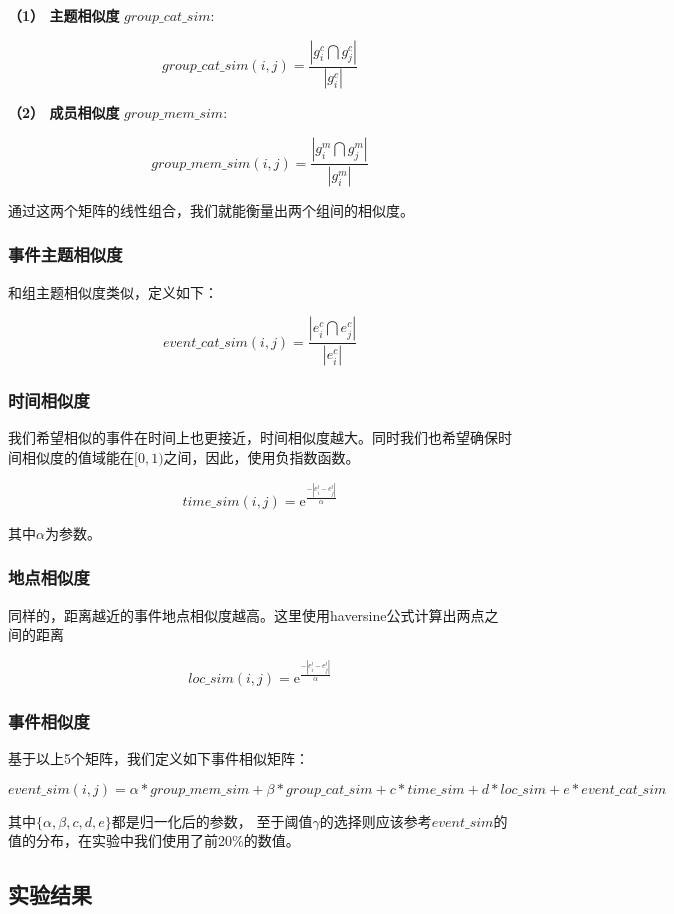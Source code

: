 \documentclass[12pt]{template}
\begin{document}
\textbf{（1） 主题相似度} \(group\_cat\_sim:\)

\[
group\_cat\_sim(i,j)=\frac{|g_i^c\bigcap g_j^c|}{|g_i^c|}
\]

\textbf{（2） 成员相似度} \(group\_mem\_sim:\)

\[
group\_mem\_sim(i,j)=\frac{|g_i^m\bigcap g_j^m|}{|g_i^m|}
\]

通过这两个矩阵的线性组合，我们就能衡量出两个组间的相似度。

\subsubsection{事件主题相似度}

和组主题相似度类似，定义如下：

\[
event\_cat\_sim(i,j)=\frac{|e_i^c\bigcap e_j^c|}{|e_i^c|}
\]

\subsubsection{时间相似度}

我们希望相似的事件在时间上也更接近，时间相似度越大。同时我们也希望确保时间相似度的值域能在\([0,1)\)之间，因此，使用负指数函数。

\[    
time\_sim(i,j)=\mathrm{e}^\frac{-|e_i^t-e_j^t|}{\alpha}
\]

其中\(\alpha\)为参数。

\subsubsection{地点相似度}

同样的，距离越近的事件地点相似度越高。这里使用haversine公式计算出两点之间的距离

\[    
loc\_sim(i,j)=\mathrm{e}^\frac{-|e_i^l-e_j^l|}{\alpha}
\]

\subsubsection{事件相似度}
基于以上5个矩阵，我们定义如下事件相似矩阵：

\[    
event\_sim(i,j)=\alpha*group\_mem\_sim+\beta*group\_cat\_sim
+{c}*time\_sim+{d}*loc\_sim+{e}*event\_cat\_sim
\]

其中\(\{\alpha,\beta,{c},{d},{e}\}\)都是归一化后的参数，
至于阈值\(\gamma\)的选择则应该参考\(event\_sim\)的值的分布，在实验中我们使用了前20\%的数值。

\subsection{实验结果}
\end{document}
